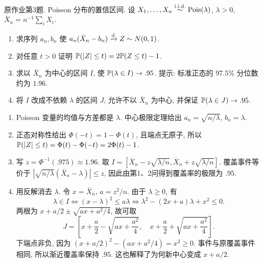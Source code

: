 \begin{exercise}\label{ps02:p03}
原作业第3题. Poisson 分布的置信区间. 设 $X_1,\ldots,X_n\stackrel{\mathrm{i.i.d.}}{\sim}\operatorname{Pois}(\lambda)$, $\lambda>0$, $\bar X_n=n^{-1}\sum_iX_i$.
\begin{enumerate}[label=\arabic*.]
\item 求序列 $a_n,b_n$ 使 $a_n(\bar X_n-b_n)\xrightarrow{\mathrm d} Z\sim N(0,1)$.
\item 对任意 $t>0$ 证明 $\mathbb P(|Z|\le t)=2\mathbb P(Z\le t)-1$.
\item 求以 $\bar X_n$ 为中心的区间 $I$, 使 $\mathbb P(\lambda\in I)\to.95$. 提示: 标准正态的 $97.5\%$ 分位数约为 $1.96$.
\item 将 $I$ 改成不依赖 $\lambda$ 的区间 $J$, 允许不以 $\bar X_n$ 为中心, 并保证 $\mathbb P(\lambda\in J)\to.95$.
\end{enumerate}
\end{exercise}
\begin{solution}
\begin{enumerate}[label=\arabic*.]
\item Poisson 变量的均值与方差都是 $\lambda$. 中心极限定理给出 $a_n=\sqrt{n/\lambda}$, $b_n=\lambda$.
\item 正态对称性给出 $\Phi(-t)=1-\Phi(t)$, 且端点无原子, 所以 $\mathbb P(|Z|\le t)=\Phi(t)-\Phi(-t)=2\Phi(t)-1$.
\item 写 $z=\Phi^{-1}(.975)\approx1.96$. 取 $I=[\bar X_n-z\sqrt{\lambda/n},\bar X_n+z\sqrt{\lambda/n}]$. 覆盖事件等价于 $|\sqrt{n/\lambda}(\bar X_n-\lambda)|\le z$, 因此由第1、2问得到覆盖率的极限为 $.95$.
\item 用反解消去 $\lambda$. 令 $x=\bar X_n$, $a=z^2/n$. 由于 $\lambda\ge0$, 有
\[
\lambda\in I\iff(x-\lambda)^2\le a\lambda
\iff\lambda^2-(2x+a)\lambda+x^2\le0.
\]
两根为 $x+a/2\pm\sqrt{ax+a^2/4}$, 故可取
\[
J=\left[x+\frac a2-\sqrt{ax+\frac{a^2}4},\quad
x+\frac a2+\sqrt{ax+\frac{a^2}4}\right].
\]
下端点非负, 因为 $(x+a/2)^2-(ax+a^2/4)=x^2\ge0$. 事件与原覆盖事件相同, 所以渐近覆盖率保持 $.95$. 这也解释了为何新中心变成 $x+a/2$.
\end{enumerate}
\end{solution}

